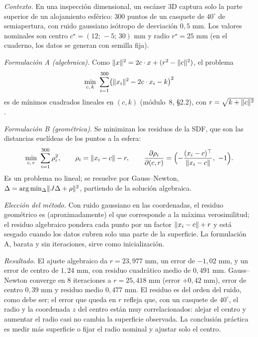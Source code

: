 \begin{ejemplo}\label{ej:esfera}
\emph{Contexto.} En una inspección dimensional, un escáner 3D captura solo la parte superior de un alojamiento esférico: 300 puntos de un casquete de $40^\circ$ de semiapertura, con ruido gaussiano isótropo de desviación $0{,}5$ mm. Los valores nominales son centro $c^\star=(12;\,-5;\,30)$ mm y radio $r^\star=25$ mm (en el cuaderno, los datos se generan con semilla fija).

\emph{Formulación A (algebraica).} Como $\lVert x\rVert^2=2c\cdot x+(r^2-\lVert c\rVert^2)$, el problema
\[
\min_{c,\,k}\ \sum_{i=1}^{300}\bigl(\norm{x_i}^2-2c\cdot x_i-k\bigr)^2
\]
es de mínimos cuadrados lineales en $(c,k)$ (módulo~8, §2.2), con $r=\sqrt{k+\lVert c\rVert^2}$.

\emph{Formulación B (geométrica).} Se minimizan los residuos de la SDF, que son las distancias euclídeas de los puntos a la esfera:
\[
\min_{c,\,r}\ \sum_{i=1}^{300}\rho_i^2,\qquad \rho_i=\norm{x_i-c}-r,\qquad \frac{\partial\rho_i}{\partial(c,r)}=\Bigl(-\frac{(x_i-c)^\T}{\norm{x_i-c}},\ -1\Bigr).
\]
Es un problema no lineal; se resuelve por Gauss--Newton, $\Delta=\arg\min_\Delta\lVert J\Delta+\rho\rVert^2$, partiendo de la solución algebraica.

\emph{Elección del método.} Con ruido gaussiano en las coordenadas, el residuo geométrico es (aproximadamente) el que corresponde a la máxima verosimilitud; el residuo algebraico pondera cada punto por un factor $\lVert x_i-c\rVert+r$ y está sesgado cuando los datos cubren solo una parte de la superficie. La formulación A, barata y sin iteraciones, sirve como inicialización.

\emph{Resultado.} El ajuste algebraico da $r=23{,}977$ mm, un error de $-1{,}02$ mm, y un error de centro de $1{,}24$ mm, con residuo cuadrático medio de $0{,}491$ mm. Gauss--Newton converge en 8 iteraciones a $r=25{,}418$ mm (error $+0{,}42$ mm), error de centro $0{,}39$ mm y residuo medio $0{,}477$ mm. El residuo es del orden del ruido, como debe ser; el error que queda en $r$ refleja que, con un casquete de $40^\circ$, el radio y la coordenada $z$ del centro están muy correlacionados: alejar el centro y aumentar el radio casi no cambia la superficie observada. La conclusión práctica es medir más superficie o fijar el radio nominal y ajustar solo el centro.
\end{ejemplo}

